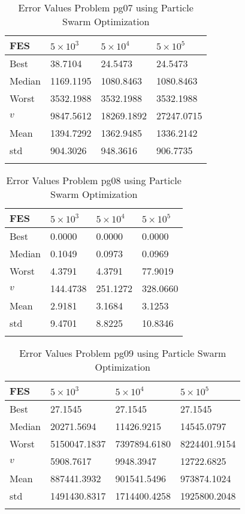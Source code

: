 \documentclass[10pt, a4paper]{book}
\begin{document}
\begin{center}
\begin{longtable}{l l l l}
FES & $5 \times 10^{3}$ & $5 \times 10^{4}$ & $5 \times 10^{5}$ \\
\hline
Best & 38.7104 & 24.5473 & 24.5473 \\
Median & 1169.1195 & 1080.8463 & 1080.8463 \\
Worst & 3532.1988 & 3532.1988 & 3532.1988 \\
$v$ & 9847.5612 & 18269.1892 & 27247.0715 \\
Mean & 1394.7292 & 1362.9485 & 1336.2142 \\
std & 904.3026 & 948.3616 & 906.7735 \\
\caption{ Error Values Problem pg07 using Particle Swarm Optimization }
\end{longtable}
\end{center}

\begin{center}
\begin{longtable}{l l l l}
FES & $5 \times 10^{3}$ & $5 \times 10^{4}$ & $5 \times 10^{5}$ \\
\hline
Best & 0.0000 & 0.0000 & 0.0000 \\
Median & 0.1049 & 0.0973 & 0.0969 \\
Worst & 4.3791 & 4.3791 & 77.9019 \\
$v$ & 144.4738 & 251.1272 & 328.0660 \\
Mean & 2.9181 & 3.1684 & 3.1253 \\
std & 9.4701 & 8.8225 & 10.8346 \\
\caption{ Error Values Problem pg08 using Particle Swarm Optimization }
\end{longtable}
\end{center}

\begin{center}
\begin{longtable}{l l l l}
FES & $5 \times 10^{3}$ & $5 \times 10^{4}$ & $5 \times 10^{5}$ \\
\hline
Best & 27.1545 & 27.1545 & 27.1545 \\
Median & 20271.5694 & 11426.9215 & 14545.0797 \\
Worst & 5150047.1837 & 7397894.6180 & 8224401.9154 \\
$v$ & 5908.7617 & 9948.3947 & 12722.6825 \\
Mean & 887441.3932 & 901541.5496 & 973874.1024 \\
std & 1491430.8317 & 1714400.4258 & 1925800.2048 \\
\caption{ Error Values Problem pg09 using Particle Swarm Optimization }
\end{longtable}
\end{center}
\end{document}
